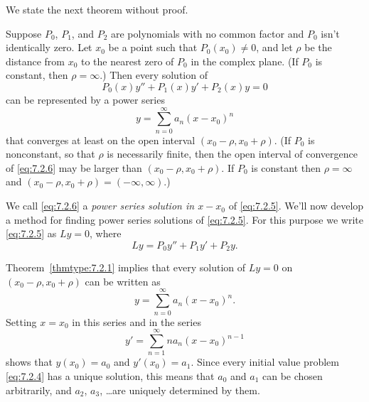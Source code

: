 We state the next theorem without proof.

\begin{theorem}
  \color{blue}
  \label{thmtype:7.2.1} Suppose $P_{0}$, $P_{1}$, and $P_{2}$ are polynomials with no common factor
  and $P_{0}$ isn't identically zero. Let $x_{0}$ be a point such that $P_{0}(x_{0})\ne0$, and let
  $\rho$ be the distance from $x_{0}$ to the nearest zero of $P_{0}$ in the complex plane. (If
  $P_{0}$ is constant, then $\rho=\infty$.) Then every solution of
  \begin{equation}
    \label{eq:7.2.5}P_{0}(x)y''+P_{1}(x)y'+P_{2}(x)y=0
  \end{equation}
  can be represented by a power series
  \begin{equation}
    \label{eq:7.2.6}y=\sum_{n=0}^{\infty}a_{n}(x-x_{0})^{n}
  \end{equation}
  that converges at least on the open interval $(x_{0}-\rho,x_{0}+\rho)$. (If $P_{0}$ is
  nonconstant, so that $\rho$ is necessarily finite, then the open interval of convergence of
  \eqref{eq:7.2.6} may be larger than $(x_{0}-\rho,x_{0}+\rho)$. If $P_{0}$ is constant then
  $\rho=\infty$ and $(x_{0}-\rho,x_{0}+\rho)=(-\infty,\infty)$.)
\end{theorem}

We call \eqref{eq:7.2.6} a {\color{blue}\it power series solution in $x-x_{0}$\/} of
\eqref{eq:7.2.5}. We'll now develop a method for finding power series solutions of \eqref{eq:7.2.5}.
For this purpose we write \eqref{eq:7.2.5} as $Ly=0$, where
\begin{equation}
  \label{eq:7.2.7}Ly=P_{0}y''+P_{1}y'+P_{2}y.
\end{equation}

Theorem~\ref{thmtype:7.2.1} implies that every solution of $Ly=0$ on $(x_{0}-\rho,x_{0}+\rho)$ can
be written as
\[
  y=\sum_{n=0}^{\infty}a_{n}(x-x_{0})^{n}.
\]
Setting $x=x_{0}$ in this series and in the series
\[
  y'=\sum_{n=1}^{\infty}na_{n}(x-x_{0})^{n-1}
\]
shows that $y(x_{0})=a_{0}$ and $y'(x_{0})=a_{1}$. Since every initial value problem
\eqref{eq:7.2.4} has a unique solution, this means that $a_{0}$ and $a_{1}$ can be chosen
arbitrarily, and $a_{2}$, $a_{3}$, \dots are uniquely determined by them.

